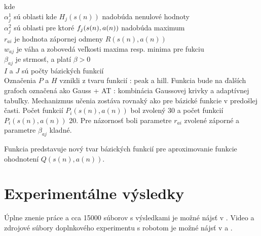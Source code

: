 kde \\
$\alpha^1_j$ sú oblasti kde $H_j(s(n))$ nadobúda nenulové hodnoty \\
$\alpha^2_j$ sú oblasti pre ktoré $f_j(\boldmath{s(n), a(n)})$ nadobúda maximum \\
$r_{ai}$ je hodnota zápornej odmeny $R(s(n), a(n))$ \\
$w_{aj}$ je váha a zobovedá veľkosti maxima resp. minima pre fukciu \\
$\beta_{aj}$ je strmosť, a platí $\beta > 0$ \\
$I$ a $J$ sú počty bázických funkcií \\

Označenia $P$ a $H$ vznikli z tvaru funkcií : peak a hill. Funkcia bude na ďalších
grafoch označená ako Gauss + AT : kombinácia Gaussovej krivky a adaptívnej tabuľky.
Mechanizmus učenia zostáva rovnaký ako pre bázické funkcie v predošlej časti.
Počet funkcií $P_i(s(n), a(n))$ bol zvolený 30 a počet funkcií $P_i(s(n), a(n))$ 20.
Pre názornosť boli parametre $r_{ai}$ zvolené záporné a parametre $\beta_{aj}$ kladné.

Funkcia \label{eq:peak_hill} predstavuje nový tvar bázických funkcií pre
aproximovanie funkcie ohodnotení $Q(s(n), a(n))$.


\section{Experimentálne výsledky}

Úplne znenie práce a cca 15000 súborov s výsledkami je možné nájsť v \cite{bib:q_learning_git}.
Video a zdrojové súbory doplnkového experimentu s robotom je možné nájsť v \cite{bib:mototko_video} a
\cite{bib:motoko_git}.
